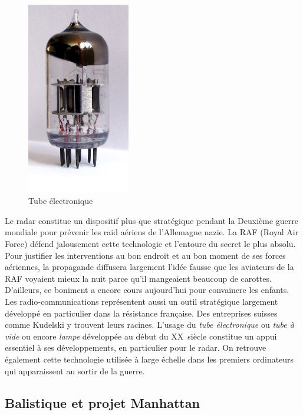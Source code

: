 \documentclass[a4paper,11pt]{book}
\begin{document}
\begin{figure} 
    \centering
    \includegraphics[width=0.4\textwidth]{media/machines/tube.jpeg}
    \caption{Tube électronique}
\end{figure}

Le radar constitue un dispositif plus que stratégique pendant la Deuxième guerre mondiale pour prévenir les raid aériens de l'Allemagne nazie. La RAF (Royal Air Force) défend jalousement cette technologie et l'entoure du secret le plus absolu. Pour justifier les interventions au bon endroit et au bon moment de ses forces aériennes, la propagande diffusera largement l'idée fausse que les aviateurs de la RAF voyaient mieux la nuit parce qu'il mangeaient beaucoup de carottes. D'ailleurs, ce boniment a encore cours aujourd'hui pour convaincre les enfants.
Les radio-communications représentent aussi un outil stratégique largement développé en particulier dans la résistance française. Des entreprises suisses comme Kudelski y trouvent leurs racines.
L'usage du \textit{tube électronique} ou \textit{tube à vide} ou encore \textit{lampe} développée au début du \textsc{XX}\ieme~siècle constitue un appui essentiel à ses développements, en particulier pour le radar. On retrouve également cette technologie utilisée à large échelle dans les premiers ordinateurs qui apparaissent au sortir de la guerre.

\subsection{Balistique et projet Manhattan}
\end{document}
